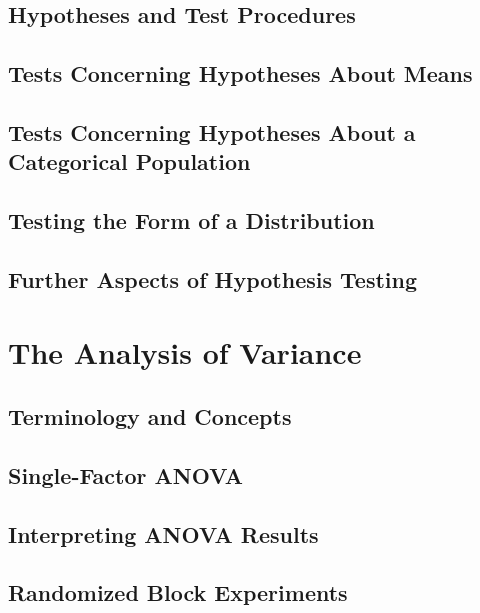 \documentclass{article}
\begin{document}
	\subsection{Hypotheses and Test Procedures} %
	
	\subsection{Tests Concerning Hypotheses About Means} %
	
	\subsection{Tests Concerning Hypotheses About a Categorical Population} %
	
	\subsection{Testing the Form of a Distribution} %
	
	\subsection{Further Aspects of Hypothesis Testing} %

\clearpage	
\section{The Analysis of Variance} %

	\subsection{Terminology and Concepts} %
	
	\subsection{Single-Factor ANOVA} %
	
	\subsection{Interpreting ANOVA Results} %
	
	\subsection{Randomized Block Experiments} %
\end{document}
